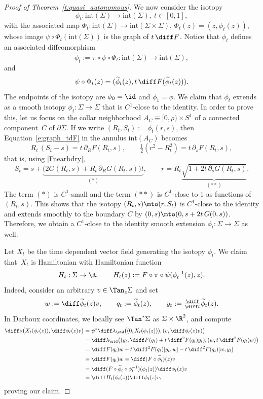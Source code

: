 \begin{proof}[Proof of Theorem~\ref{t:quasi_autonomous}]
We now consider the isotopy
\[
\phi_t:\mathrm{int}(\Sigma)\to\mathrm{int}(\Sigma),\ t\in[0,1],
\]
with the associated map $\Phi_t:\mathrm{int}(\Sigma)\to\mathrm{int}(\Sigma\times\Sigma)$, $\Phi_t(z)=(z,\phi_t(z))$, whose image $\psi\circ\Phi_t(\mathrm{int}(\Sigma))$ is the graph of $t\,\diff F$. Notice that $\phi_t$ defines an associated diffeomorphism
\[
\widetilde\phi_t:=\pi\circ\psi\circ\Phi_t:\mathrm{int}(\Sigma)\to\mathrm{int}(\Sigma),
\]
and
\begin{equation}
\label{e:graph_tdF}
\psi\circ\Phi_t(z)=(\widetilde\phi_t(z),t\,\diff F(\widetilde\phi_t(z))).
\end{equation}
The endpoints of the isotopy are $\phi_0=\id$ and $\phi_1=\phi$. We claim that $\phi_t$ extends as a smooth isotopy $\phi_t:\Sigma\to\Sigma$ that is $C^1$-close to the identity. In order to prove this, let us focus on the collar neighborhood $A_C\equiv[0,\rho)\times S^1$ of a connected component~$C$ of $\partial\Sigma$. If we write $(R_t,S_t):=\phi_t(r,s)$, then Equation~\eqref{e:graph_tdF} in the annulus $\mathrm{int}(A_C)$ becomes
\[
R_t\,(S_t-s) = t\,\partial_RF(R_t,s),\qquad
\tfrac 12 (r^2-R_t^2) = t\,\partial_sF(R_t,s),
\]
that is, using \eqref{Fnearbdry},
\[
S_t = s + \underbrace{\big(2 G(R_t,s) + R_t\,\partial_R G(R_t,s) \big) t}_{(*)},\qquad
r = R_t\underbrace{\sqrt{ 1 + 2 t\,\partial_sG(R_t,s) }}_{(**)}.
\]
The term $(*)$ is $C^1$-small and the term $(**)$ is $C^1$-close to 1 as functions of $(R_t,s)$. This shows that the isotopy $(R_t,s)\mto(r,S_t)$ is $C^1$-close to the identity and extends smoothly to the boundary $C$ by $(0,s)\mto(0,s +2 t\,G(0,s))$. Therefore, we obtain a $C^1$-close to the identity smooth extension $\phi_t:\Sigma\to\Sigma$ as well.

Let $X_t$ be the time dependent vector field generating the isotopy $\phi_t$. We claim that~$X_t$ is Hamiltonian with Hamiltonian function
\begin{equation}
\label{H_t}
H_t:\Sigma\to\R,\qquad H_t(z) := F\circ\pi\circ\psi(\phi_t^{-1}(z),z).
\end{equation}
Indeed, consider an arbitrary $v\in\Tan_z\Sigma$ and set
\[
w:=\diff\widetilde\phi_t(z)v, \qquad q_t:=\widetilde\phi_t(z), \qquad y_t:=\tfrac{\diff}{\diff t}\widetilde\phi_t(z).
\]
In Darboux coordinates, we locally see $\Tan^*\Sigma$ as $\Sigma\times\R^2$, and compute
\begin{align*}
\diff\nu\big(X_t(\phi_t(z)),\diff\phi_t(z)v\big)
&=
\psi^*\diff\lambda_{\std} \big( (0,X_t(\phi_t(z))) , (v,\diff\phi_t(z)v) \big)\\
&=
\diff\lambda_{\std}\big( (y_t,\diff F(q_t) + t\,\diff^2F(q_t)y_t) , (w,t\,\diff^2F(q_t)w) \big)\\
&=
\diff F(q_t)w + t\,\diff^2F(q_t)[y_t,w] - t\,\diff^2F(q_t)[w,y_t]\\
&=
\diff F(q_t)w
= \diff (F\circ\widetilde\phi_t)(z)v\\
&= \diff (F\circ\widetilde\phi_t\circ\phi_t^{-1})(\phi_t(z))\diff\phi_t(z)v\\
&=\diff H_t(\phi_t(z))\diff\phi_t(z)v,
\end{align*}
proving our claim.


\end{proof}
